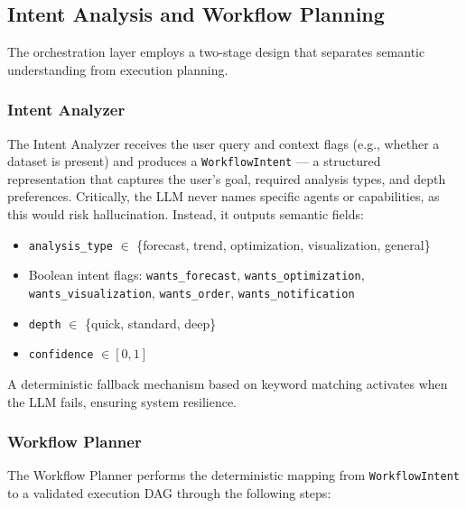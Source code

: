\documentclass[conference]{IEEEtran}
\begin{document}
\subsection{Intent Analysis and Workflow Planning}

The orchestration layer employs a two-stage design that separates semantic understanding from execution planning.

\subsubsection{Intent Analyzer} The Intent Analyzer receives the user query and context flags (e.g., whether a dataset is present) and produces a \texttt{WorkflowIntent} --- a structured representation that captures the user's goal, required analysis types, and depth preferences. Critically, the LLM never names specific agents or capabilities, as this would risk hallucination. Instead, it outputs semantic fields:

\begin{itemize}
    \item \texttt{analysis\_type} $\in$ \{forecast, trend, optimization, visualization, general\}
    \item Boolean intent flags: \texttt{wants\_forecast}, \texttt{wants\_optimization}, \texttt{wants\_visualization}, \texttt{wants\_order}, \texttt{wants\_notification}
    \item \texttt{depth} $\in$ \{quick, standard, deep\}
    \item \texttt{confidence} $\in [0, 1]$
\end{itemize}

A deterministic fallback mechanism based on keyword matching activates when the LLM fails, ensuring system resilience.

\subsubsection{Workflow Planner} The Workflow Planner performs the deterministic mapping from \texttt{WorkflowIntent} to a validated execution DAG through the following steps:
\end{document}
